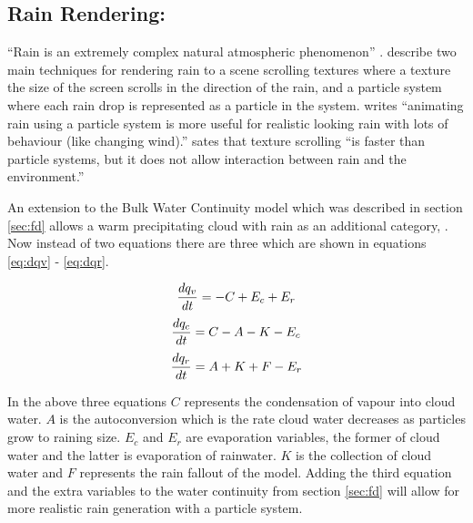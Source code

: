 \subsection{Rain Rendering:}
\label{sec:rain}
“Rain is an extremely complex natural atmospheric phenomenon” \citep*{APuig-Centelles09}.
\citet*{APuig-Centelles09} describe two main techniques for rendering rain to a scene scrolling textures where a texture the size of the screen scrolls in the direction of the rain, and a particle system where each rain drop is represented as a particle in the system.
\citet{STariq07} writes “animating rain using a particle system is more useful for realistic looking rain with lots of behaviour (like changing wind).”
\citet*{APuig-Centelles09} sates that texture scrolling “is faster than particle systems, but it does not allow interaction between rain and the environment.”

An extension to the Bulk Water Continuity model which was described in section \ref{sec:fd} allows a warm precipitating cloud with rain as an additional category, \citet{houze1994cloud}.
Now instead of two equations there are three which are shown in equations \ref{eq:dqv} - \ref{eq:dqr}.

\begin{equation} \label{eq:dqv}
  \centering
  \frac{dq_{v}}{dt} = - C + E_{c} + E_{r}
\end{equation}
\begin{equation} \label{eq:dqc}
  \centering
  \frac{dq_{c}}{dt} = C - A - K - E_{c}
\end{equation}
\begin{equation} \label{eq:dqr}
  \centering
  \frac{dq_{r}}{dt} = A + K + F - E_{r}
\end{equation}

In the above three equations $C$ represents the condensation of vapour into cloud water.
$A$ is the autoconversion which is the rate cloud water decreases as particles grow to raining size.
$E_{c}$ and $E_{r}$  are evaporation variables, the former of cloud water and the latter is evaporation of rainwater.
$K$ is the collection of cloud water and $F$ represents the rain fallout of the model.
Adding the third equation and the extra variables to the water continuity from section \ref{sec:fd} will allow for more realistic rain generation with a particle system.
